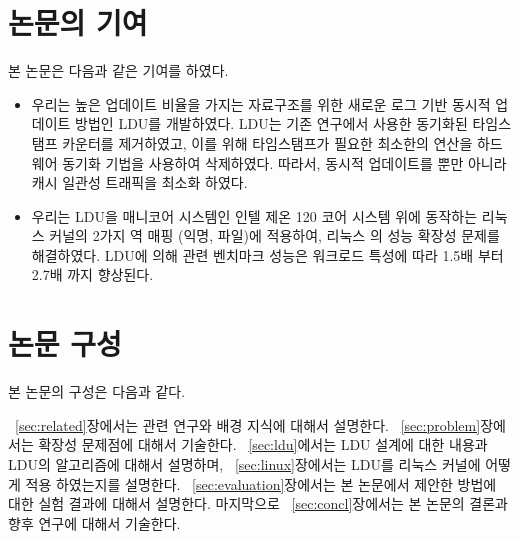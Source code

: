 \newpage
\section{논문의 기여}\label{sec:introcontri}
본 논문은 다음과 같은 기여를 하였다.
\begin{itemize}
\item 우리는 높은 업데이트 비율을 가지는 자료구조를 위한 새로운 로그 기반 동시적 업데이트
 방법인 LDU를 개발하였다.
LDU는 기존 연구에서 사용한 동기화된 타임스탬프 카운터를 제거하였고, 이를 위해 
타임스탬프가 필요한 최소한의 연산을 하드웨어 동기화 기법을 사용하여 삭제하였다.
따라서, 동시적 업데이트를 뿐만 아니라 캐시 일관성 트래픽을 최소화 하였다.
\item 
우리는 LDU을 매니코어 시스템인 인텔 제온 120 코어 시스템 위에 동작하는 리눅스 커널의 
2가지 역 매핑 (익명, 파일)에 적용하여, 리눅스 의 성능 확장성 문제를 해결하였다.
LDU에 의해  관련 벤치마크 성능은 워크로드 특성에 따라 1.5배 부터 2.7배 까지 향상된다.
\end{itemize}


\newpage
\section{논문 구성} \label{sec:intro}
본 논문의 구성은 다음과 같다.

~\ref{sec:related}장에서는 관련 연구와 배경 지식에 대해서 설명한다.
~\ref{sec:problem}장에서는 확장성 문제점에 대해서 기술한다. 
~\ref{sec:ldu}에서는 LDU 설계에 대한 내용과 LDU의 알고리즘에 대해서 설명하며,
~\ref{sec:linux}장에서는 LDU를 리눅스 커널에 어떻게 적용 하였는지를 설명한다.
~\ref{sec:evaluation}장에서는 본 논문에서 제안한 방법에 대한 실험 결과에 대해서 설명한다. 
마지막으로 ~\ref{sec:concl}장에서는 본 논문의 결론과 향후 연구에 대해서 기술한다. 

